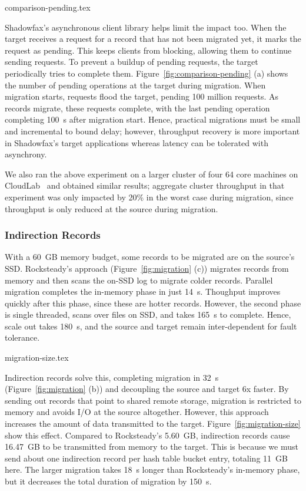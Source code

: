  {comparison-pending.tex}

Shadowfax's asynchronous client library helps limit the
impact too.
%
When the target receives a request for a record that has not been
migrated yet, it marks the request as pending.
%
This keeps clients from blocking, allowing them to
continue sending requests.
%
To prevent a buildup of pending requests, the target periodically tries to complete them.
%
Figure~\ref{fig:comparison-pending} (a) shows the number of pending operations at the
target during migration.
%
When migration starts, requests flood the target, pending 100 million requests.
%
As records migrate, these requests complete, with the last pending operation
completing 100~s after migration start.
%
Hence, practical migrations must be small and incremental to bound
delay; however, throughput recovery is more important in Shadowfax's target
applications whereas latency can be tolerated with asynchrony.

We also ran the above experiment on a larger cluster of four 64 core machines
on CloudLab~\cite{cloudlab} and obtained similar results; aggregate cluster
throughput in that experiment was only impacted by 20\% in the worst case
during migration, since throughput is only reduced at the source during
migration.

\subsubsection{Indirection Records}
\label{sec:eval:migration:indir}

With a 60~GB memory budget, some records to be migrated are on the source's
SSD.
%
Rocksteady's approach (Figure~\ref{fig:migration} (c)) migrates records from
memory and then scans the on-SSD log to migrate colder records.
%
Parallel migration completes the in-memory phase in just 14~s.
%
Thoughput improves quickly after this phase, since these are hotter records.
%
However, the second phase is single threaded, scans over files on SSD,
and takes 165~s to complete.
%
Hence, scale out takes 180~s, and the source and target remain inter-dependent
for fault tolerance.

 {migration-size.tex}

Indirection records solve this, completing migration in 32~s
(Figure~\ref{fig:migration} (b)) and decoupling the source and target 6x faster.
%
By sending out records that point to shared remote storage, migration
is restricted to memory and avoids I/O at the source altogether.
%
%
However, this approach increases the amount of data transmitted to the target.
%
Figure~\ref{fig:migration-size} show this effect.
%
Compared to Rocksteady's 5.60~GB, indirection records cause
16.47~GB to be transmitted from memory to the target.
%
This is because we must send about one indirection record per hash table bucket
entry, totaling 11~GB here.
%
%
The larger migration takes 18~s longer than Rocksteady's in-memory phase, but it
decreases the total duration of migration by 150~s.


